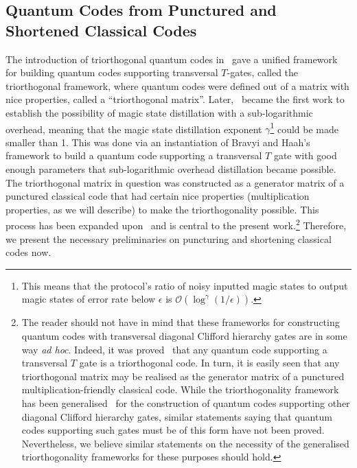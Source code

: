 \documentclass[11pt]{article}
\theoremstyle{definition}
\begin{document}
\subsection{Quantum Codes from Punctured and Shortened Classical Codes}\label{sec:qcode_from_puncture}

The introduction of triorthogonal quantum codes in~\cite{bravyi2012magic} gave a unified framework for building quantum codes supporting transversal $T$-gates, called the triorthogonal framework, where quantum codes were defined out of a matrix with nice properties, called a ``triorthogonal matrix''. Later,~\cite{hastings2018distillation} became the first work to establish the possibility of magic state distillation with a sub-logarithmic overhead, meaning that the magic state distillation exponent $\gamma$\footnote{This means that the protocol's ratio of noisy inputted magic states to output magic states of error rate below $\epsilon$ is $\mathcal{O}(\log^\gamma(1/\epsilon))$.} could be made smaller than 1.
This was done via an instantiation of Bravyi and Haah's framework to build a quantum code supporting a transversal $T$ gate with good enough parameters that sub-logarithmic overhead distillation became possible. The triorthogonal matrix in question was constructed as a generator matrix of a punctured classical code that had certain nice properties (multiplication properties, as we will describe) to make the triorthogonality possible. This process has been expanded upon~\cite{krishna2019towards,wills2024constant,nguyen2024quantum} and is central to the present work.\footnote{The reader should not have in mind that these frameworks for constructing quantum codes with transversal diagonal Clifford hierarchy gates are in some way \textit{ad hoc}. Indeed, it was proved~\cite{rengaswamy2020optimality} that any quantum code supporting a transversal $T$ gate is a triorthogonal code. In turn, it is easily seen that any triorthogonal matrix may be realised as the generator matrix of a punctured multiplication-friendly classical code. While the triorthogonality framework has been generalised~\cite{krishna2018magic,wills2024constant,nguyen2024quantum} for the construction of quantum codes supporting other diagonal Clifford hierarchy gates, similar statements saying that quantum codes supporting such gates must be of this form have not been proved. Nevertheless, we believe similar statements on the necessity of the generalised triorthogonality frameworks for these purposes should hold.} Therefore, we present the necessary preliminaries on puncturing and shortening classical codes now.
\end{document}
